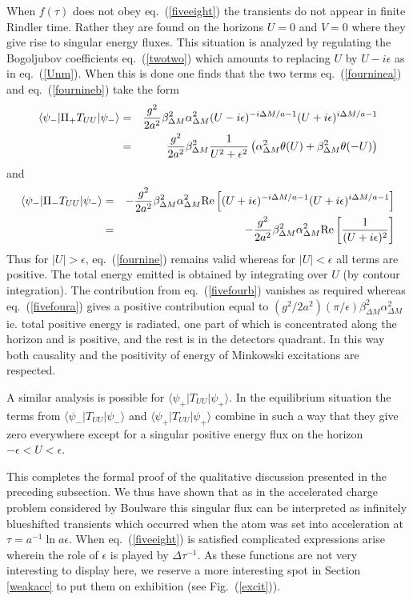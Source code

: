 \documentclass[12pt,oneside]{report}
\def\elematrice#1#2#3{\langle #1|#2|#3 \rangle}
\begin{document}
When $f(\tau)$ does not obey eq.~(\ref{fiveeight}) the
transients do not appear in finite Rindler time. Rather they are 
found on the horizons
$U=0$ and $V=0$ where they give rise to  singular energy
fluxes. This situation is analyzed by
regulating  the Bogoljubov coefficients eq.~(\ref{twotwo}) which
amounts to replacing $U$ by $U-i \epsilon$ as in eq.~(\ref{Unm}). When
this is done one finds that the two terms eq.~(\ref{fourninea}) and
eq.~(\ref{fournineb}) take the form
 \begin{eqnarray}
\elematrice{\psi_-} { \Pi_+ T_{UU} }{\psi_-} &=&
{g^2 \over 2 a^2 } \beta^2_{\Delta M} \alpha^2_{\Delta M} 
(U-i\epsilon)^{-i\Delta M / a -1}(U+i\epsilon)^{i\Delta M / a -1}\nonumber\\
&=& {g^2 \over 2 a^2 } \beta^2_{\Delta M} {1 \over U^2 + \epsilon^2}
\left( \alpha^2_{\Delta M} \theta(U) + \beta^2_{\Delta M} \theta( -U)\right)
\label{fivefoura}
\end{eqnarray}
and
 \begin{eqnarray}
\elematrice{\psi_-} { \Pi_- T_{UU} }{\psi_-}&=&
-{g^2 \over 2 a^2 } \beta^2_{\Delta M}
\alpha^2_{\Delta M}  {\rm Re }\left[
(U+i\epsilon)^{-i\Delta M / a
-1}(U+i\epsilon)^{i\Delta M / a -1}\right]\nonumber\\ 
&=& -{g^2 \over 2 a^2 }
\beta^2_{\Delta M} \alpha^2_{\Delta M}  {\rm Re }\left[ 
{1 \over( U + i\epsilon )^2}\right]
\label{fivefourb}
\end{eqnarray}
Thus for $\vert U \vert > \epsilon$, eq.~(\ref{fournine}) remains valid whereas
for  $\vert U \vert < \epsilon$ all terms are positive. The total energy emitted
is obtained by integrating over $U$ (by contour integration). The contribution
from eq.~(\ref{fivefourb}) vanishes as required whereas eq.~(\ref{fivefoura})
gives a positive contribution equal to $(g^2/ 2 a^2) (\pi /\epsilon)
\beta^2_{\Delta M} \alpha^2_{\Delta M}$ ie. total positive energy is radiated,
one part of which is concentrated along the horizon and is positive, and the
rest is in the detectors quadrant. In this way both causality and the positivity
of energy of Minkowski excitations are respected.

  A similar analysis is possible for
$\elematrice{\psi_+} { T_{UU} }{\psi_+}$. In the equilibrium situation 
the terms from $\elematrice{\psi_-} { T_{UU} }{\psi_-}$ and 
$\elematrice{\psi_+} { T_{UU} }{\psi_+}$ combine in such a way that they give zero
everywhere except for a singular positive energy flux on the horizon $-\epsilon < U <
\epsilon$. 

This completes the formal proof of the qualitative discussion
presented in the preceding subsection. We thus have shown
that as
 in the accelerated charge
problem considered by Boulware this singular flux can be 
interpreted as  infinitely
blueshifted transients which occurred when the atom was set into
acceleration at $\tau = a^{-1} \ln a \epsilon$. When eq.~(\ref{fiveeight}) is satisfied
complicated expressions arise wherein the role of $\epsilon$ is played
by  $\Delta\tau^{-1}$. As these functions are not very
interesting to display here, we reserve a more interesting spot
in Section \ref{weakacc} to put them on exhibition (see
Fig.~(\ref{excit})).
\end{document}
